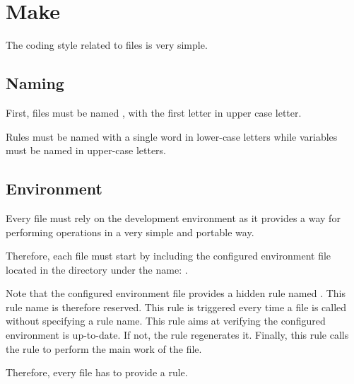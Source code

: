 %
%
%
%
%
%

%
%

\section{Make}
\label{section:make}

The coding style related to  files is very simple.


\subsection{Naming}

First,  files must be named , with the first
letter in upper case letter.

Rules must be named with a single word in lower-case letters while variables
must be named in upper-case letters.


\subsection{Environment}

Every  file must rely on the development environment as it
provides a way for performing operations in a very simple and portable way.

Therefore, each  file must start by including the configured
 environment file located in the  directory
under the name: .

Note that the configured environment  file provides a hidden
rule named \code{\_}. This rule name is therefore reserved. This rule is
triggered every time a  file is called without specifying
a rule name. This rule aims at verifying the configured environment is
up-to-date. If not, the rule regenerates it. Finally, this rule calls the
 rule to perform the main work of the  file.

Therefore, every  file has to provide a  rule.

